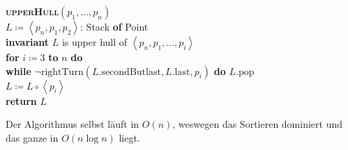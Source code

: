 \begin{pseudocode}
  \textbf{\textsc{upperHull}}\( (p_1,\dots,p_n) \) \\
  \( L \coloneqq \left\langle p_n,p_1,p_2 \right\rangle \): Stack \textbf{of} Point \\
  \textbf{invariant} \( L \) is upper hull of \( \left\langle p_n,p_1,\dots,p_i \right\rangle \) \\
  \textbf{for} \( i \coloneqq 3 \) \textbf{to} \( n \) \textbf{do} \\
  \phantom{\enskip} \textbf{while} \( \neg \text{rightTurn}(L\text{.secondButlast},  L\text{.last}, p_i) \) \textbf{do} \( L\text{.pop} \) \\
  \phantom{\enskip} \( L \coloneqq L \circ \left\langle p_i \right\rangle \) \\
  \textbf{return} \( L \)
\end{pseudocode}

Der Algorithmus selbst läuft in \( O(n) \), weswegen das Sortieren dominiert und das ganze in \( O(n\log n) \) liegt.